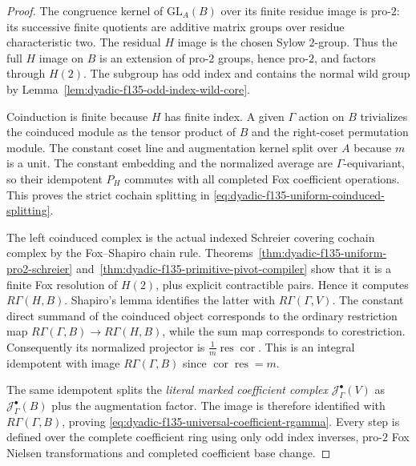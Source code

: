 \begin{proof}
The congruence
kernel of
$\mathrm{GL}_A(B)$
over its finite
residue image
is pro-$2$:
its successive
finite quotients
are additive
matrix groups
over residue
characteristic
two.
The residual
$H$ image is
the chosen
Sylow $2$-group.
Thus the full
$H$ image on
$B$ is an
extension of
pro-$2$ groups,
hence pro-$2$,
and factors through
$H(2)$.
The subgroup has
odd index
and contains
the normal wild
group by
Lemma~\ref{lem:dyadic-f135-odd-index-wild-core}.

Coinduction
is finite
because $H$
has finite
index.  A
given $\Gamma$
action on $B$
trivializes the
coinduced module
as the tensor
product of
$B$ and the
right-coset
permutation
module.
The constant
coset line and
augmentation
kernel split
over $A$ because
$m$ is a unit.
The constant
embedding and
the normalized
average are
$\Gamma$-equivariant,
so their idempotent
$P_H$ commutes
with all
completed Fox
coefficient
operations.
This proves
the strict
cochain splitting
in
\eqref{eq:dyadic-f135-uniform-coinduced-splitting}.

The left
coinduced
complex is
the actual
indexed
Schreier covering
cochain complex
by the
Fox--Shapiro
chain rule.
Theorems~\ref{thm:dyadic-f135-uniform-pro2-schreier}
and~\ref{thm:dyadic-f135-primitive-pivot-compiler}
show that it
is a finite
Fox resolution
of $H(2)$,
plus explicit
contractible
pairs.
Hence it
computes
$R\Gamma(H,B)$.
Shapiro's lemma
identifies the
latter with
$R\Gamma(\Gamma,V)$.
The constant
direct summand
of the coinduced
object corresponds
to the ordinary
restriction map
$R\Gamma(\Gamma,B)
\to R\Gamma(H,B)$,
while the
sum map corresponds
to corestriction.
Consequently its
normalized
projector is
$\frac1m
\operatorname{res}
\operatorname{cor}$.
This is an
integral
idempotent with
image
$R\Gamma(\Gamma,B)$
since
$\operatorname{cor}
\operatorname{res}=m$.

The same
idempotent
splits the
\emph{literal
marked coefficient
complex}
$\mathcal J_\Gamma^\bullet(V)$
as
$\mathcal J_\Gamma^\bullet(B)$
plus the augmentation
factor.
The image
is therefore
identified
with
$R\Gamma(\Gamma,B)$,
proving
\eqref{eq:dyadic-f135-universal-coefficient-rgamma}.
Every step is
defined over
the complete
coefficient ring
using only odd
index inverses,
pro-$2$ Fox
Nielsen transformations
and completed
coefficient
base change.
\end{proof}


